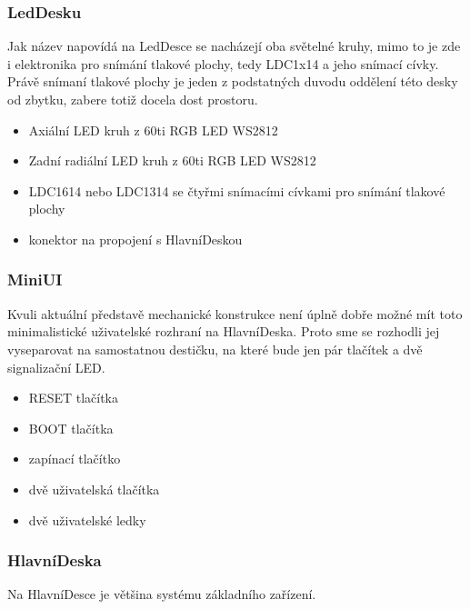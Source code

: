 \subsubsection{LedDesku}
Jak název napovídá na LedDesce se nacházejí oba světelné kruhy, mimo to je zde i elektronika pro snímání tlakové plochy, tedy LDC1x14 \cite{LDC1614} a jeho snímací cívky.
Právě snímaní tlakové plochy je jeden z podstatných duvodu oddělení této desky od zbytku, zabere totiž docela dost prostoru.

\begin{itemize}
    \item Axiální LED kruh z 60ti RGB LED WS2812
    \item Zadní radiální LED kruh z 60ti RGB LED WS2812
    \item LDC1614 nebo LDC1314 se čtyřmi snímacími cívkami pro snímání tlakové plochy
    \item konektor na propojení s HlavníDeskou
\end{itemize}

\subsubsection{MiniUI}
Kvuli aktuální představě mechanické konstrukce není úplně dobře možné mít toto minimalistické uživatelské rozhraní na HlavníDeska.
Proto sme se rozhodli jej vyseparovat na samostatnou destičku, na které bude jen pár tlačítek a dvě signalizační LED.

\begin{itemize}
    \item RESET tlačítka
    \item BOOT tlačítka
    \item zapínací tlačítko
    \item dvě uživatelská tlačítka 
    \item dvě uživatelské ledky
\end{itemize}

\subsubsection{HlavníDeska}
Na HlavníDesce je většina systému základního zařízení.

